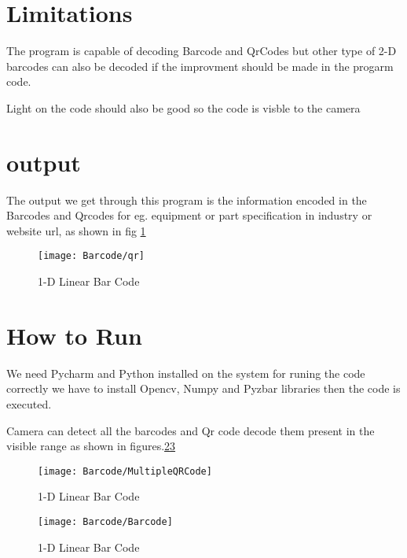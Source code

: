 \section{Limitations}

The program is capable of decoding Barcode and QrCodes but other type of 2-D barcodes can also be decoded if the improvment should be made in the progarm code.

Light on the code should also be good so the code is visble to the camera 

\section{output}

The output we get through this program is the information encoded in the Barcodes and Qrcodes for eg. equipment or part specification in industry or website url, as shown in fig \ref{fig:qr}

\begin{figure}
    \begin{center}
        \texttt{[image: Barcode/qr]}
        \caption{1-D Linear Bar Code}\label{fig:qr}
    \end{center}
\end{figure}


\section{How to Run}

We need Pycharm and Python installed on the system for runing the code correctly we have to install Opencv, Numpy and Pyzbar libraries then the code is executed.


Camera can detect all the barcodes and Qr code decode them present in the visible range as shown in figures.\ref{fig:Multiple QR code}\ref*{fig:Bar code}


\begin{figure}
    \begin{center}
        \texttt{[image: Barcode/MultipleQRCode]}
        \caption{1-D Linear Bar Code}\label{fig:Multiple QR code}
    \end{center}
\end{figure}


\begin{figure}
    \begin{center}
        \texttt{[image: Barcode/Barcode]}
        \caption{1-D Linear Bar Code}\label{fig:Bar code}
    \end{center}
\end{figure}


